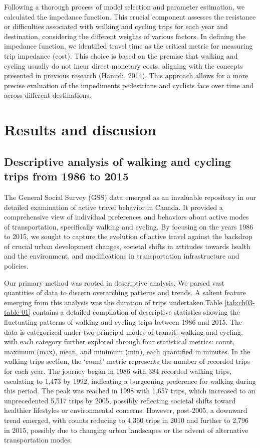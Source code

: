 \documentclass[
11pt, %
oneside, %
english, %
singlespacing, %
]{macthesis} %
\begin{document}
Following a thorough process of model selection and parameter estimation, we calculated the impedance function. This crucial component assesses the resistance or difficulties associated with walking and cycling trips for each year and destination, considering the different weights of various factors. In defining the impedance function, we identified travel time as the critical metric for measuring trip impedance (cost). This choice is based on the premise that walking and cycling usually do not incur direct monetary costs, aligning with the concepts presented in previous research (Hamidi, 2014). This approach allows for a more precise evaluation of the impediments pedestrians and cyclists face over time and across different destinations.

\section{Results and discusion}\label{results-and-discusion}

\subsection{Descriptive analysis of walking and cycling trips from 1986 to 2015}\label{descriptive-analysis-of-walking-and-cycling-trips-from-1986-to-2015}

The General Social Survey (GSS) data emerged as an invaluable repository in our detailed examination of active travel behavior in Canada. It provided a comprehensive view of individual preferences and behaviors about active modes of transportation, specifically walking and cycling. By focusing on the years 1986 to 2015, we sought to capture the evolution of active travel against the backdrop of crucial urban development changes, societal shifts in attitudes towards health and the environment, and modifications in transportation infrastructure and policies.

Our primary method was rooted in descriptive analysis. We parsed vast quantities of data to discern overarching patterns and trends. A salient feature emerging from this analysis was the duration of trips undertaken.Table \ref{tab:ch03-table-01} contains a detailed compilation of descriptive statistics showing the fluctuating patterns of walking and cycling trips between 1986 and 2015. The data is categorized under two principal modes of transit: walking and cycling, with each category further explored through four statistical metrics: count, maximum (max), mean, and minimum (min), each quantified in minutes. In the walking trips section, the `count' metric represents the number of recorded trips for each year. The journey began in 1986 with 384 recorded walking trips, escalating to 1,473 by 1992, indicating a burgeoning preference for walking during this period. The peak was reached in 1998 with 1,657 trips, which increased to an unprecedented 5,517 trips by 2005, possibly reflecting societal shifts toward healthier lifestyles or environmental concerns. However, post-2005, a downward trend emerged, with counts reducing to 4,360 trips in 2010 and further to 2,796 in 2015, possibly due to changing urban landscapes or the advent of alternative transportation modes.
\end{document}

